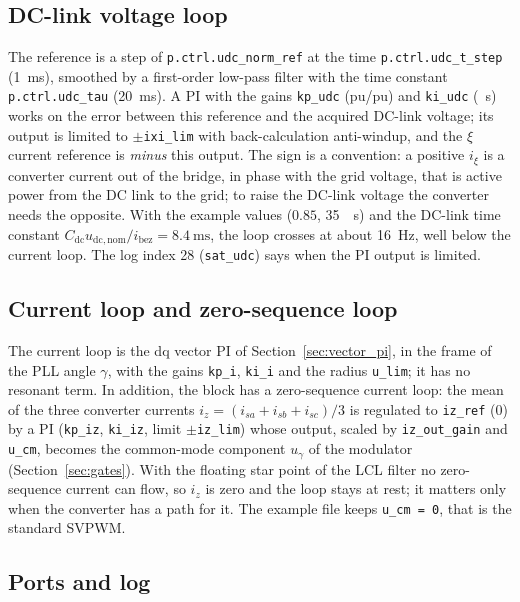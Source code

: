 \documentclass[11pt,a4paper]{scrartcl}
\newcommand{\ped}[1]{_{\mathrm{#1}}}
\newcommand{\code}[1]{\texttt{#1}}
\begin{document}
\begin{onehalfspace}
\subsection{DC-link voltage loop}
\label{sec:udc_loop}

The reference is a step of \code{p.ctrl.udc\_norm\_ref} at the time \code{p.ctrl.udc\_t\_step} (\SI{1}{\milli\second}), smoothed by a first-order low-pass filter with the time constant \code{p.ctrl.udc\_tau} (\SI{20}{\milli\second}). A PI with the gains \code{kp\_udc} (pu/pu) and \code{ki\_udc} (\si{\per\second}) works on the error between this reference and the acquired DC-link voltage; its output is limited to $\pm$\code{ixi\_lim} with back-calculation anti-windup, and the $\xi$ current reference is \emph{minus} this output. The sign is a convention: a positive $i_\xi$ is a converter current out of the bridge, in phase with the grid voltage, that is active power from the DC link to the grid; to raise the DC-link voltage the converter needs the opposite. With the example values ($0.85$, \SI{35}{\per\second}) and the DC-link time constant $C\ped{dc} u\ped{dc,nom}/i\ped{bez} = \SI{8.4}{\milli\second}$, the loop crosses at about \SI{16}{\hertz}, well below the current loop. The log index 28 (\code{sat\_udc}) says when the PI output is limited.

\subsection{Current loop and zero-sequence loop}
\label{sec:gfl_current_loop}

The current loop is the dq vector PI of Section~\ref{sec:vector_pi}, in the frame of the PLL angle $\gamma$, with the gains \code{kp\_i}, \code{ki\_i} and the radius \code{u\_lim}; it has no resonant term. In addition, the block has a zero-sequence current loop: the mean of the three converter currents $i_z = (i_{sa} + i_{sb} + i_{sc})/3$ is regulated to \code{iz\_ref} (0) by a PI (\code{kp\_iz}, \code{ki\_iz}, limit $\pm$\code{iz\_lim}) whose output, scaled by \code{iz\_out\_gain} and \code{u\_cm}, becomes the common-mode component $u_\gamma$ of the modulator (Section~\ref{sec:gates}). With the floating star point of the LCL filter no zero-sequence current can flow, so $i_z$ is zero and the loop stays at rest; it matters only when the converter has a path for it. The example file keeps \code{u\_cm = 0}, that is the standard SVPWM.

\subsection{Ports and log}
\label{sec:gfl_ports}


\end{onehalfspace}
\end{document}
